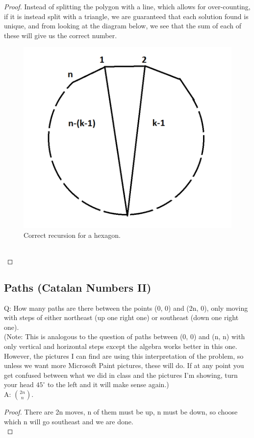 \begin{proof}
    Instead of splitting the polygon with a line, which allows for over-counting, if it is instead split with a triangle, we are guaranteed that each solution found is unique, and from looking at the diagram below, we see that the sum of each of these will give us the correct number.
    \begin{figure}
        \includegraphics[width=\linewidth]{figures/correctHexagon.png}
        \caption{Correct recursion for a hexagon.}
        \label{fig:hex2}
    \end{figure}\\
\end{proof}



\subsection{Paths (Catalan Numbers II)}
Q: How many paths are there between the points (0, 0) and (2n, 0), only moving with steps of either northeast (up one right one) or southeast (down one right one).\\ (Note: This is analogous to the question of paths between (0, 0) and (n, n) with only vertical and horizontal steps except the algebra works better in this one. However, the pictures I can find are using this interpretation of the problem, so unless we want more Microsoft Paint pictures, these will do. If at any point you get confused between what we did in class and the pictures I'm showing, turn your head $45^\circ$ to the left and it will make sense again.)\\
A: $\binom{2n} n$. 
\begin{proof}
    There are 2n moves, n of them must be up, n must be down, so choose which n will go southeast and we are done.\\
\end{proof}

